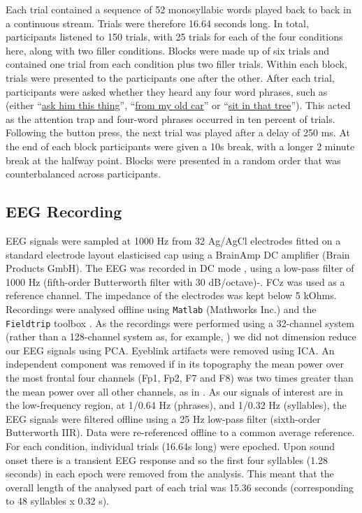 \documentclass[10pt,letterpaper]{article}
\newcommand{\citet}[1]{\cite{#1}}
\begin{document}
Each trial contained a sequence of 52 monosyllabic words played back to back in a continuous stream. Trials were therefore 16.64 seconds long. In total, participants listened to 150 trials, with 25 trials for each of the four conditions here, along with two filler conditions. Blocks were made up of six trials and contained one trial from each condition plus two filler trials. Within each block, trials were presented to the participants one after the other. After each trial, participants were asked whether they heard any four word phrases, such as (either ``\underline{ask him this thing}'', ``\underline{from my old car}'' or ``\underline{sit in that tree}''). This acted as the attention trap and four-word phrases occurred in ten percent of trials. Following the button press, the next trial was played after a delay of 250 ms. At the end of each block participants were given a 10s break, with a longer 2 minute break at the halfway point. Blocks were presented in a random order that was counterbalanced across participants.

\subsection*{EEG Recording}
 
EEG signals were sampled at 1000 Hz from 32 Ag/AgCl electrodes fitted on a standard electrode layout elasticised cap using a BrainAmp DC amplifier (Brain Products GmbH). The EEG was recorded in DC mode , using a low-pass filter of 1000 Hz (fifth-order Butterworth filter with 30 dB/octave)-. FCz was used as a reference channel. The impedance of the electrodes was kept below 5 kOhms. Recordings were analysed offline using \texttt{Matlab} (Mathworks Inc.) and the \texttt{Fieldtrip} toolbox \cite{FieldTrip}. As the recordings were performed using a 32-channel system (rather than a 128-channel system as, for example, \citet{DingEtAl2017}) we did not dimension reduce our EEG signals using PCA. Eyeblink artifacts were removed using ICA. An independent component was removed if in its topography the mean power over the most frontal four channels (Fp1, Fp2, F7 and F8) was two times greater than the mean power over all other channels, as in \citet{DingEtAl2017}. As our signals of interest are in the low-frequency region, at 1/0.64 Hz (phrases), and 1/0.32 Hz (syllables), the EEG signals were filtered offline using a 25 Hz low-pass filter (sixth-order Butterworth IIR). Data were re-referenced offline to a common average reference. For each condition, individual trials (16.64s long) were epoched. Upon sound onset there is a transient EEG response and so the first four syllables (1.28 seconds) in each epoch were removed from the analysis. This meant that the overall length of the analysed part of each trial was 15.36 seconds (corresponding to 48 syllables x 0.32 s).
\end{document}
